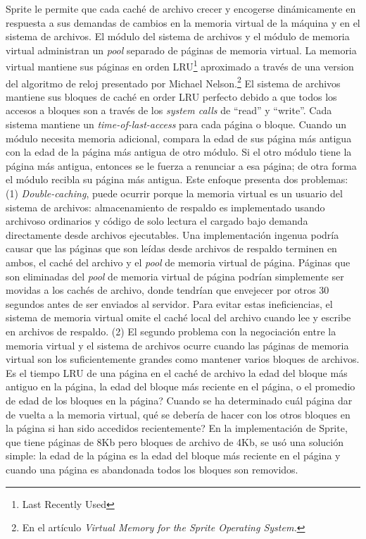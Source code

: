 Sprite le permite que cada caché de archivo crecer y encogerse dinámicamente en respuesta a sus demandas de cambios en la memoria virtual de la máquina y en el sistema de archivos. El módulo del sistema de archivos y el módulo de memoria virtual administran un \emph{pool} separado de páginas de memoria virtual. La memoria virtual mantiene sus páginas en orden LRU\footnote{Last Recently Used} aproximado a través de una version del algoritmo de reloj presentado por Michael Nelson.\footnote{En el artículo \emph{Virtual Memory for the Sprite Operating System.}} El sistema de archivos mantiene sus bloques de caché en order LRU perfecto debido a que todos los accesos a bloques son a través de los \emph{system calls} de ``read'' y ``write''. Cada sistema mantiene un \emph{time-of-last-access} para cada página o bloque. Cuando un módulo necesita memoria adicional, compara la edad de sus página más antigua con la edad de la página más antigua de otro módulo. Si el otro módulo tiene la página más antigua, entonces se le fuerza a renunciar a esa página; de otra forma el módulo recibla su página más antigua. Este enfoque presenta dos problemas: (1) \emph{Double-caching}, puede ocurrir porque la memoria virtual es un usuario del sistema de archivos: almacenamiento de respaldo es implementado usando archivoso ordinarios y código de solo lectura el cargado bajo demanda directamente desde archivos ejecutables. Una implementación ingenua podría causar que las páginas que son leídas desde archivos de respaldo terminen en ambos, el caché del archivo y el \emph{pool} de memoria virtual de página. Páginas que son eliminadas del \emph{pool} de memoria virtual de página podrían simplemente ser movidas a los cachés de archivo, donde tendrían que envejecer por otros 30 segundos antes de ser enviados al servidor. Para evitar estas ineficiencias, el sistema de memoria virtual omite el caché local del archivo cuando lee y escribe en archivos de respaldo. (2) El segundo problema con la negociación entre la memoria virtual y el sistema de archivos ocurre cuando las páginas de memoria virtual son los suficientemente grandes como mantener varios bloques de archivos. Es el tiempo LRU de una página en el caché de archivo la edad del bloque más antiguo en la página, la edad del bloque más reciente en el página, o el promedio de edad de los bloques en la página? Cuando se ha determinado cuál página dar de vuelta a la memoria virtual, qué se debería de hacer con los otros bloques en la página si han sido accedidos recientemente? En la implementación de Sprite, que tiene páginas de 8Kb pero bloques de archivo de 4Kb, se usó una solución simple: la edad de la página es la edad del bloque más reciente en el página y cuando una página es abandonada todos los bloques son removidos.

